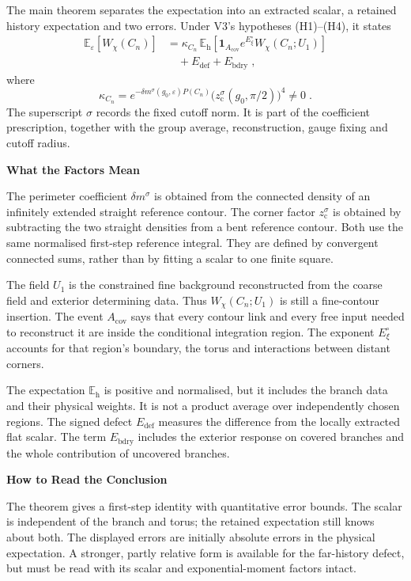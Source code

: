 \documentclass[11pt,a4paper]{article}
\newcommand{\id}{\mathbf 1}
\newcommand{\Eh}{\mathbb E_{\mathrm h}}
\newcommand{\subhead}[1]{\par\vspace{4pt}\textbf{\color{ink}#1}\par}
\begin{document}
The main theorem separates the expectation into an extracted scalar, a retained history expectation and two errors. Under V3's hypotheses (H1)--(H4), it states
\begin{equation*}
    \begin{aligned}
        \mathbb E_\varepsilon[W_\chi(C_n)]
        &=\kappa_{C_n}\,
            \Eh\!\left[\id_{A_{\mathrm{cov}}}
                e^{E^\circ_\xi}W_\chi(C_n;U_1)\right]\\
        &\quad+E_{\mathrm{def}}+E_{\mathrm{bdry}}\;,
    \end{aligned}
\end{equation*}
where
\begin{equation*}
    \kappa_{C_n}
        =e^{-\delta m^\sigma(g_0,\varepsilon)P(C_n)}
            \bigl(z^\sigma_{\mathrm c}(g_0,\pi/2)\bigr)^4
        \neq 0\;.
\end{equation*}
The superscript $\sigma$ records the fixed cutoff norm. It is part of the coefficient prescription, together with the group average, reconstruction, gauge fixing and cutoff radius.

\subhead{What the Factors Mean}
The perimeter coefficient $\delta m^\sigma$ is obtained from the connected density of an infinitely extended straight reference contour. The corner factor $z^\sigma_{\mathrm c}$ is obtained by subtracting the two straight densities from a bent reference contour. Both use the same normalised first-step reference integral. They are defined by convergent connected sums, rather than by fitting a scalar to one finite square.

The field $U_1$ is the constrained fine background reconstructed from the coarse field and exterior determining data. Thus $W_\chi(C_n;U_1)$ is still a fine-contour insertion. The event $A_{\mathrm{cov}}$ says that every contour link and every free input needed to reconstruct it are inside the conditional integration region. The exponent $E^\circ_\xi$ accounts for that region's boundary, the torus and interactions between distant corners.

The expectation $\Eh$ is positive and normalised, but it includes the branch data and their physical weights. It is not a product average over independently chosen regions. The signed defect $E_{\mathrm{def}}$ measures the difference from the locally extracted flat scalar. The term $E_{\mathrm{bdry}}$ includes the exterior response on covered branches and the whole contribution of uncovered branches.

\subhead{How to Read the Conclusion}
The theorem gives a first-step identity with quantitative error bounds. The scalar is independent of the branch and torus; the retained expectation still knows about both. The displayed errors are initially absolute errors in the physical expectation. A stronger, partly relative form is available for the far-history defect, but must be read with its scalar and exponential-moment factors intact.
\end{document}
